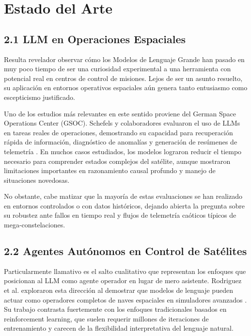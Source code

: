 \section{Estado del Arte}

\subsection{2.1 LLM en Operaciones Espaciales}

Resulta revelador observar cómo los Modelos de Lenguaje Grande han pasado en muy poco tiempo de ser una curiosidad experimental a una herramienta con potencial real en centros de control de misiones. Lejos de ser un asunto resuelto, su aplicación en entornos operativos espaciales aún genera tanto entusiasmo como escepticismo justificado.

Uno de los estudios más relevantes en este sentido proviene del German Space Operations Center (GSOC). Schefels y colaboradores evaluaron el uso de LLMs en tareas reales de operaciones, demostrando su capacidad para recuperación rápida de información, diagnóstico de anomalías y generación de resúmenes de telemetría \cite{schefels2024evaluating}. En muchos casos estudiados, los modelos lograron reducir el tiempo necesario para comprender estados complejos del satélite, aunque mostraron limitaciones importantes en razonamiento causal profundo y manejo de situaciones novedosas.

No obstante, cabe matizar que la mayoría de estas evaluaciones se han realizado en entornos controlados o con datos históricos, dejando abierta la pregunta sobre su robustez ante fallos en tiempo real y flujos de telemetría caóticos típicos de mega-constelaciones.

\subsection{2.2 Agentes Autónomos en Control de Satélites}

Particularmente llamativo es el salto cualitativo que representan los enfoques que posicionan al LLM como agente operador en lugar de mero asistente. Rodriguez et al. exploraron esta dirección al demostrar que modelos de lenguaje pueden actuar como operadores completos de naves espaciales en simuladores avanzados \cite{rodriguez2024llm}. Su trabajo contrasta fuertemente con los enfoques tradicionales basados en reinforcement learning, que suelen requerir millones de iteraciones de entrenamiento y carecen de la flexibilidad interpretativa del lenguaje natural.


